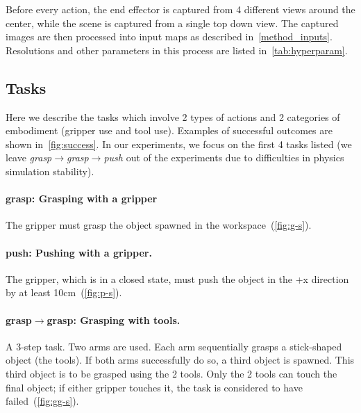 \documentclass[10pt,twocolumn,letterpaper]{article}
\begin{document}
Before every action, the end effector is captured from 4 different views around the center, while the scene is captured from a single top down view. The captured images are then processed into input maps as described in~\cref{method_inputs}. Resolutions and other parameters in this process are listed in~\cref{tab:hyperparam}.





\subsection{Tasks}
\label{exp:tasks}

Here we describe the tasks which involve 2 types of actions and 2 categories of embodiment (\ie gripper use and tool use). Examples of successful outcomes are shown in~\cref{fig:success}. In our experiments, we focus on the first 4 tasks listed (we leave \emph{grasp$\rightarrow$grasp$\rightarrow$push} out of the experiments due to difficulties in physics simulation stability).

\vspace{-10pt}

\paragraph{grasp: Grasping with a gripper} The gripper must grasp the object spawned in the workspace~(\cref{fig:g-s}).

\vspace{-10pt}

\paragraph{push: Pushing with a gripper.} The gripper, which is in a closed state, must push the object in the +x direction by at least 10cm~(\cref{fig:p-s}).

\vspace{-10pt}

\paragraph{grasp$\rightarrow$grasp: Grasping with tools.} A 3-step task. Two arms are used. Each arm sequentially grasps a stick-shaped object (the tools). If both arms successfully do so, a third object is spawned. This third object is to be grasped using the 2 tools. Only the 2 tools can touch the final object; if either gripper touches it, the task is considered to have failed~(\cref{fig:gg-s}).
\end{document}

